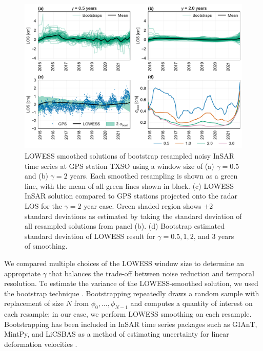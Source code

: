 \begin{figure}[h]
	\centering
	\includegraphics[width=.99\textwidth]{figures/chapter5-lowess/figure-results-bootstrap.pdf}
	\caption[Bootstrap uncertainties for LOWESS solutions]{
	LOWESS smoothed solutions of bootstrap resampled noisy InSAR time series at GPS station TXSO using a window size of (a) $ \gamma = 0.5 $ and (b) $ \gamma = 2 $ years. Each smoothed resampling is shown as a green line, with the mean of all green lines shown in black.
	(c) LOWESS InSAR solution compared to GPS stations projected onto the radar LOS for the $ \gamma = 2 $ year case. Green shaded region shows $ \pm 2  $ standard deviations as estimated by taking the standard deviation of all resampled solutions from panel (b).
	(d) Bootstrap estimated standard deviation of LOWESS result for $ \gamma = 0.5, 1, 2 $, and $ 3 $ years of smoothing.
	}
	\label{fig:ch5-results-bootstrap}
\end{figure}


We compared multiple choices of the LOWESS window size to determine an appropriate $ \gamma $ that balances the trade-off between noise reduction and temporal resolution.
To estimate the variance of the LOWESS-smoothed solution, we used the bootstrap technique \citep{Efron1979BootstrapMethodsAnother, Efron1994IntroductionBootstrap}.
Bootstrapping repeatedly draws a random sample with replacement of size $ N $ from $ \phi_0, \ldots, \phi_{N-1} $ and computes a quantity of interest on each resample; in our case, we perform LOWESS smoothing on each resample.
Bootstrapping has been included in InSAR time series packages such as GIAnT, MintPy, and LiCSBAS as a method of estimating uncertainty for linear deformation velocities
\citep{Agram2013NewRadarInterferometric, Yunjun2019SmallBaselineInsar, Morishita2020LicsbasOpenSource}.

